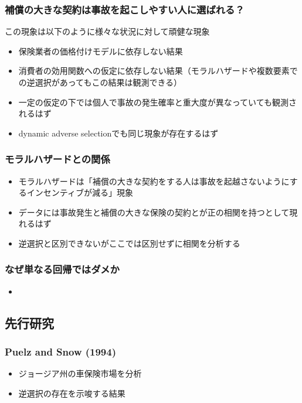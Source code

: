 \documentclass[dvipdfmx, 12pt]{beamer}
\begin{document}
\begin{frame}\frametitle{\small 補償の大きな契約は事故を起こしやすい人に選ばれる？}
この現象は以下のように様々な状況に対して頑健な現象
	\begin{itemize}
	\item 保険業者の価格付けモデルに依存しない結果
	\item 消費者の効用関数への仮定に依存しない結果（モラルハザードや複数要素での逆選択があってもこの結果は観測できる）
	\item 一定の仮定の下では個人で事故の発生確率と重大度が異なっていても観測されるはず
	\item dynamic adverse selectionでも同じ現象が存在するはず
	\end{itemize}
\end{frame}

\begin{frame}\frametitle{モラルハザードとの関係}
	\begin{itemize}
	\item モラルハザードは「補償の大きな契約をする人は事故を起越さないようにするインセンティブが減る」現象
	\item データには事故発生と補償の大きな保険の契約とが正の相関を持つとして現れるはず
	\item 逆選択と区別できないがここでは区別せずに相関を分析する
	\end{itemize}
\end{frame}

\begin{frame}\frametitle{なぜ単なる回帰ではダメか}
	\begin{itemize}
	\item 
	\end{itemize}
\end{frame}

\subsection{先行研究}
\begin{frame}\frametitle{Puelz and Snow (1994)}
	\begin{itemize}
	\item ジョージア州の車保険市場を分析
	\item 逆選択の存在を示唆する結果
	\end{itemize}
\end{frame}
\end{document}
